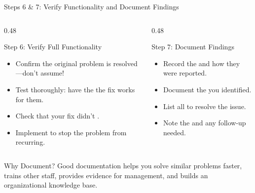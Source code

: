\documentclass[aspectratio=169]{beamer}  %
\begin{document}
\begin{frame}{Steps 6 \& 7: Verify Functionality and Document Findings}
    \begin{columns}[T]
        \begin{column}{0.48\textwidth}
            \begin{block}{Step 6: Verify Full Functionality}
                \begin{itemize}
                    \item Confirm the original problem is resolved---don't assume!
                    \item Test thoroughly: have the  the fix works for them.
                    \item Check that your fix didn't .
                    \item Implement  to stop the problem from recurring.
                \end{itemize}
            \end{block}
        \end{column}
        \begin{column}{0.48\textwidth}
            \begin{block}{Step 7: Document Findings}
                \begin{itemize}
                    \item Record the  and how they were reported.
                    \item Document the  you identified.
                    \item List all  to resolve the issue.
                    \item Note the  and any follow-up needed.
                \end{itemize}
            \end{block}
        \end{column}
    \end{columns}
    
    \vspace{0.3em}
    \begin{exampleblock}{Why Document?}
        Good documentation helps you solve similar problems faster, trains other staff, provides evidence for management, and builds an organizational knowledge base.
    \end{exampleblock}
\end{frame}
\end{document}
